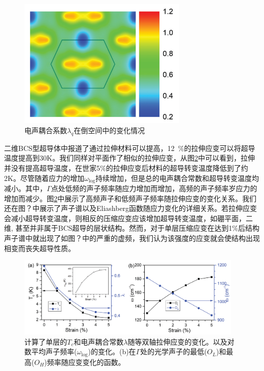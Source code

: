 \begin{figure}
  \includegraphics[width=0.72\textwidth]{figs/ch5_tib7_coupling.png}
  \centering
  \caption{电声耦合系数$\lambda_{q}$在倒空间中的变化情况}
  \label{fig:ch5_tib7_coupling}
\end{figure}

二维BCS型超导体中报道了通过拉伸材料可以提高，\SI{12}{\percent}的拉伸应变可以将超导温度提高到30K。我们同样对平面作了相似的拉伸应变，从图\ref{fig:ch5_tib7_strain}中可以看到，拉伸并没有提高超导温度，在世家5\%的拉伸应变后材料的超导转变温度降低到了约2K。尽管随着应力的增加$\omega_\mathrm{log}$持续增加，但是总的电声耦合常数和超导转变温度均减小。其中，$\Gamma$点处低频的声子频率随应力增加而增加，高频的声子频率岁应力的增加而减少。图\ref{fig:ch5_tib7_strain}中展示了高频声子和低频声子频率随拉伸应变的变化关系。我们还在图？中展示了声子谱以及Eliashberg函数随应力变化的详细关系。若拉伸应变会减小超导转变温度，则相反的压缩应变应该增加超导转变温度，如硼平面\cite{cheng2017suppressed}，二维\cite{liao2020doping},
甚至并非属于BCS超导的层状结构\cite{nie2009suppression}。然而，对于单层压缩应变在达到1\%后结构声子谱中就出现了如图？中的严重的虚频，我们认为该强度的应变就会使结构出现相变而丧失超导性质。

\begin{figure}
  \includegraphics[width=0.96\textwidth]{figs/ch5_tib7_strain.png}
  \centering
  \caption{计算了单层的$T_c$和电声耦合常数$\lambda$随等双轴拉伸应变的变化。以及对数平均声子频率($\omega_{\mathrm{log}}$)的变化。(b)在$\Gamma$处的光学声子的最低($O_L$)和最高($O_H$)频率随应变变化的函数。}
  \label{fig:ch5_tib7_strain}
\end{figure}

